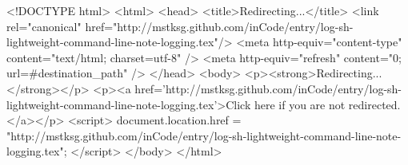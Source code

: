 <!DOCTYPE html>
<html>
<head>
<title>Redirecting...</title>
<link rel="canonical" href="http://mstksg.github.com/inCode/entry/log-sh-lightweight-command-line-note-logging.tex"/>
<meta http-equiv="content-type" content="text/html; charset=utf-8" />
<meta http-equiv="refresh" content="0; url=#{destination_path}" />
</head>
<body>
  <p><strong>Redirecting...</strong></p>
  <p><a href='http://mstksg.github.com/inCode/entry/log-sh-lightweight-command-line-note-logging.tex'>Click here if you are not redirected.</a></p>
  <script>
    document.location.href = "http://mstksg.github.com/inCode/entry/log-sh-lightweight-command-line-note-logging.tex";
  </script>
</body>
</html>

